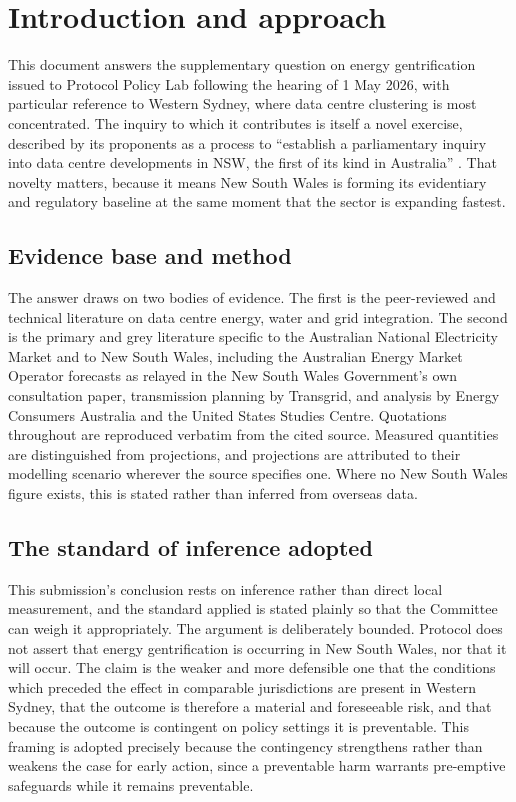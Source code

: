 \chapter{Introduction and approach}
\label{ch:sq2:intro}

This document answers the supplementary question on energy gentrification issued to Protocol Policy Lab following the hearing of 1 May 2026, with particular reference to Western Sydney, where data centre clustering is most concentrated. The inquiry to which it contributes is itself a novel exercise, described by its proponents as a process to \enquote{establish a parliamentary inquiry into data centre developments in NSW, the first of its kind in Australia} \autocite{greensNSWDataCentreInquiry2026}. That novelty matters, because it means New South Wales is forming its evidentiary and regulatory baseline at the same moment that the sector is expanding fastest.

\section{Evidence base and method}
\label{sec:sq2:method}

The answer draws on two bodies of evidence. The first is the peer-reviewed and technical literature on data centre energy, water and grid integration. The second is the primary and grey literature specific to the Australian National Electricity Market and to New South Wales, including the Australian Energy Market Operator forecasts as relayed in the New South Wales Government's own consultation paper, transmission planning by Transgrid, and analysis by Energy Consumers Australia and the United States Studies Centre. Quotations throughout are reproduced verbatim from the cited source. Measured quantities are distinguished from projections, and projections are attributed to their modelling scenario wherever the source specifies one. Where no New South Wales figure exists, this is stated rather than inferred from overseas data.

\section{The standard of inference adopted}
\label{sec:sq2:inference}

This submission's conclusion rests on inference rather than direct local measurement, and the standard applied is stated plainly so that the Committee can weigh it appropriately. The argument is deliberately bounded. Protocol does not assert that energy gentrification is occurring in New South Wales, nor that it will occur. The claim is the weaker and more defensible one that the conditions which preceded the effect in comparable jurisdictions are present in Western Sydney, that the outcome is therefore a material and foreseeable risk, and that because the outcome is contingent on policy settings it is preventable. This framing is adopted precisely because the contingency strengthens rather than weakens the case for early action, since a preventable harm warrants pre-emptive safeguards while it remains preventable.
